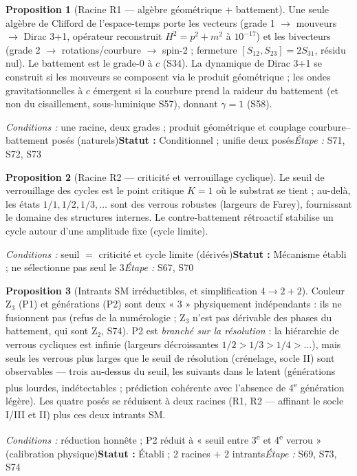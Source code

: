 \documentclass[11pt,a4paper]{article}
\theoremstyle{definition}
\newtheorem{prop}{Proposition}
\newcommand{\statut}[3]{\par\smallskip\noindent\textit{Conditions :} #1\quad\textbf{Statut :} #2\quad\textit{Étape :} #3\par\medskip}
\begin{document}
\begin{prop}[Racine R1 — algèbre géométrique + battement]
Une seule algèbre de Clifford de l'espace-temps porte les vecteurs (grade 1 $\to$ mouveurs $\to$ Dirac 3+1, opérateur reconstruit $H^2=p^2+m^2$ à $10^{-17}$) et les bivecteurs (grade 2 $\to$ rotations/courbure $\to$ spin-2 ; fermeture $[S_{12},S_{23}]=2S_{31}$, résidu nul). Le battement est le grade-0 à $c$ (S34). La dynamique de Dirac 3+1 se construit si les mouveurs se composent via le produit géométrique ; les ondes gravitationnelles à $c$ émergent si la courbure prend la raideur du battement (et non du cisaillement, sous-luminique S57), donnant $\gamma=1$ (S58).
\end{prop}
\statut{une racine, deux grades ; produit géométrique et couplage courbure--battement posés (naturels)}{Conditionnel ; unifie deux posés}{S71, S72, S73}

\begin{prop}[Racine R2 — criticité et verrouillage cyclique]
Le seuil de verrouillage des cycles est le point critique $K=1$ où le substrat se tient ; au-delà, les états $1/1,1/2,1/3,\dots$ sont des verrous robustes (largeurs de Farey), fournissant le domaine des structures internes. Le contre-battement rétroactif stabilise un cycle autour d'une amplitude fixe (cycle limite).
\end{prop}
\statut{seuil $=$ criticité et cycle limite (dérivés)}{Mécanisme établi ; ne sélectionne pas seul le 3}{S67, S70}

\begin{prop}[Intrants SM irréductibles, et simplification $4\to 2{+}2$]
Couleur Z$_3$ (P1) et générations (P2) sont deux « 3 » physiquement indépendants : ils ne fusionnent pas (refus de la numérologie ; Z$_3$ n'est pas dérivable des phases du battement, qui sont Z$_2$, S74). P2 est \emph{branché sur la résolution} : la hiérarchie de verrous cycliques est infinie (largeurs décroissantes $1/2>1/3>1/4>\dots$), mais seuls les verrous plus larges que le seuil de résolution (crénelage, socle II) sont observables — trois au-dessus du seuil, les suivants dans le latent (générations plus lourdes, indétectables ; prédiction cohérente avec l'absence de 4\textsuperscript{e} génération légère). Les quatre posés se réduisent à deux racines (R1, R2 — affinant le socle I/III et II) plus ces deux intrants SM.
\end{prop}
\statut{réduction honnête ; P2 réduit à « seuil entre 3\textsuperscript{e} et 4\textsuperscript{e} verrou » (calibration physique)}{Établi ; 2 racines $+$ 2 intrants}{S69, S73, S74}
\end{document}

